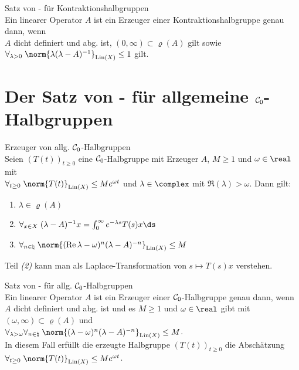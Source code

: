 \linie

\begin{Satz}{Satz von - für Kontraktionshalbgruppen}\\
    Ein linearer Operator $A$ ist ein Erzeuger einer Kontraktionshalbgruppe genau dann, wenn\\
    $A$ dicht definiert und abg. ist,
    $(0, \infty) \subset \varrho(A)$ gilt sowie
    $\forall_{\lambda > 0}\; \norm{\lambda (\lambda-A)^{-1}}_{\Lin(X)} \le 1$ gilt.
\end{Satz}

\pagebreak

\section{%
    Der Satz von - für allgemeine \texorpdfstring{$\mathcal{C}_0$}{C₀}-Halbgruppen%
}

\begin{Satz}{Erzeuger von allg. $\mathcal{C}_0$-Halbgruppen}\\
    Seien $(T(t))_{t \ge 0}$ eine $\mathcal{C}_0$-Halbgruppe mit Erzeuger $A$,
    $M \ge 1$ und $\omega \in \real$ mit\\
    $\forall_{t \ge 0}\; \norm{T(t)}_{\Lin(X)} \le M e^{\omega t}$ und
    $\lambda \in \complex$ mit $\Re(\lambda) > \omega$.
    Dann gilt:
    \begin{enumerate}
        \item
        $\lambda \in \varrho(A)$

        \item
        $\forall_{x \in X}\; (\lambda-A)^{-1} x = \int_0^\infty e^{-\lambda s} T(s) x \ds$

        \item
        $\forall_{n \in \natural}\;
        \norm{(\Re \lambda - \omega)^n (\lambda-A)^{-n}}_{\Lin(X)} \le M$
    \end{enumerate}
\end{Satz}

\begin{Bem}
    Teil \emph{(2)} kann man als Laplace-Transformation von $s \mapsto T(s) x$ verstehen.
\end{Bem}

\linie

\begin{Satz}{Satz von - für allg. $\mathcal{C}_0$-Halbgruppen}\\
    Ein linearer Operator $A$ ist ein Erzeuger einer $\mathcal{C}_0$-Halbgruppe genau dann, wenn\\
    $A$ dicht definiert und abg. ist und
    es $M \ge 1$ und $\omega \in \real$ gibt mit
    $(\omega, \infty) \subset \varrho(A)$ und\\
    $\forall_{\lambda > \omega} \forall_{n \in \natural}\;
    \norm{(\lambda - \omega)^n (\lambda-A)^{-n}}_{\Lin(X)} \le M$.\\
    In diesem Fall erfüllt die erzeugte Halbgruppe $(T(t))_{t \ge 0}$ die Abschätzung\\
    $\forall_{t \ge 0}\; \norm{T(t)}_{\Lin(X)} \le M e^{\omega t}$.
\end{Satz}

